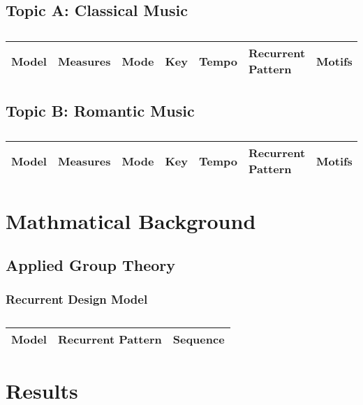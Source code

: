 \subsection{Topic A: Classical Music}

\centering	
\begin{table}[H]\tiny
	\caption{}	
	\begin{tabular}{p{1cm}p{1cm}p{1cm}p{1cm}p{1cm}p{1cm}p{1cm}}
	\hline	
	Model & Measures & Mode & Key & Tempo & Recurrent Pattern & Motifs \\
	\hline 
	\hline 
	\end{tabular}
\end{table}

\subsection{Topic B: Romantic Music}


\centering	
\begin{table}[H]\tiny
	\caption{}	
	\begin{tabular}{p{1cm}p{1cm}p{1cm}p{1cm}p{1cm}p{1cm}p{1cm}}
		\hline	
		Model & Measures & Mode & Key & Tempo & Recurrent Pattern & Motifs \\
		\hline 
		\hline 
	\end{tabular}
\end{table}

\section{Mathmatical Background}


\subsection{Applied Group Theory}

\subsubsection{Recurrent Design Model}

\centering	
\begin{table}[H]\tiny
	\caption{}	
	\begin{tabular}{p{1cm}p{1cm}p{1cm}}
		\hline	
		Model & Recurrent Pattern & Sequence \\
		\hline 
		\hline 
	\end{tabular}
\end{table}


\section{Results}

